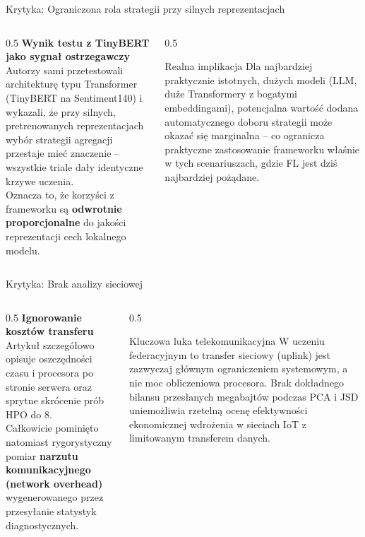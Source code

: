 \documentclass[9pt,aspectratio=169]{beamer}
\begin{document}
\begin{frame}{Krytyka: Ograniczona rola strategii przy silnych reprezentacjach}
\begin{columns}[T]
\begin{column}{0.5\textwidth}
\textbf{Wynik testu z TinyBERT jako sygnał ostrzegawczy}\\[4pt]
Autorzy sami przetestowali architekturę typu Transformer (TinyBERT na Sentiment140) i wykazali, że przy silnych, pretrenowanych reprezentacjach wybór strategii agregacji przestaje mieć znaczenie -- wszystkie triale dały identyczne krzywe uczenia.\\[6pt]
Oznacza to, że korzyści z frameworku są \textbf{odwrotnie proporcjonalne} do jakości reprezentacji cech lokalnego modelu.
\end{column}
\begin{column}{0.5\textwidth}
\begin{infoboxorange}{Realna implikacja}
Dla najbardziej praktycznie istotnych, dużych modeli (LLM, duże Transformery z bogatymi embeddingami), potencjalna wartość dodana automatycznego doboru strategii może okazać się marginalna -- co ogranicza praktyczne zastosowanie frameworku właśnie w tych scenariuszach, gdzie FL jest dziś najbardziej pożądane.
\end{infoboxorange}
\end{column}
\end{columns}
\end{frame}

\begin{frame}{Krytyka: Brak analizy sieciowej}
\begin{columns}[T]
\begin{column}{0.5\textwidth}
\textbf{Ignorowanie kosztów transferu}\\[4pt]
Artykuł szczegółowo opisuje oszczędności czasu i procesora po stronie serwera oraz sprytne skrócenie prób HPO do 8.\\[6pt]
Całkowicie pominięto natomiast rygorystyczny pomiar \textbf{narzutu komunikacyjnego (network overhead)} wygenerowanego przez przesyłanie statystyk diagnostycznych.
\end{column}
\begin{column}{0.5\textwidth}
\begin{infoboxorange}{Kluczowa luka telekomunikacyjna}
W uczeniu federacyjnym to transfer sieciowy (uplink) jest zazwyczaj głównym ograniczeniem systemowym, a nie moc obliczeniowa procesora. Brak dokładnego bilansu przesłanych megabajtów podczas PCA i JSD uniemożliwia rzetelną ocenę efektywności ekonomicznej wdrożenia w sieciach IoT z limitowanym transferem danych.
\end{infoboxorange}
\end{column}
\end{columns}
\end{frame}
\end{document}
